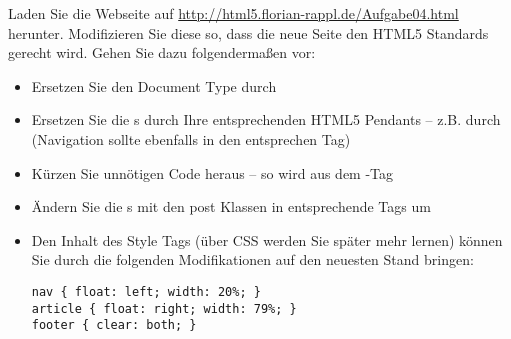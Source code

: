 %
\par Laden Sie die Webseite auf
\url{http://html5.florian-rappl.de/Aufgabe04.html} herunter. Modifizieren Sie
diese so, dass die neue Seite den HTML5 Standards gerecht wird. Gehen Sie dazu
folgendermaßen vor:
%
\begin{itemize}
\item
Ersetzen Sie den Document Type durch 
\item
Ersetzen Sie die s durch Ihre entsprechenden HTML5 Pendants – z.B.
 durch  (Navigation sollte ebenfalls in den
entsprechen Tag)
\item
Kürzen Sie unnötigen Code heraus – so wird aus dem -Tag 
\item
Ändern Sie die s mit den post Klassen in entsprechende 
Tags um
\item
Den Inhalt des Style Tags (über CSS werden Sie später mehr lernen) können Sie
durch die folgenden Modifikationen auf den neuesten Stand bringen:
%
\begin{lstlisting}
nav { float: left; width: 20%; }
article { float: right; width: 79%; }
footer { clear: both; }
\end{lstlisting}
%
\end{itemize}
